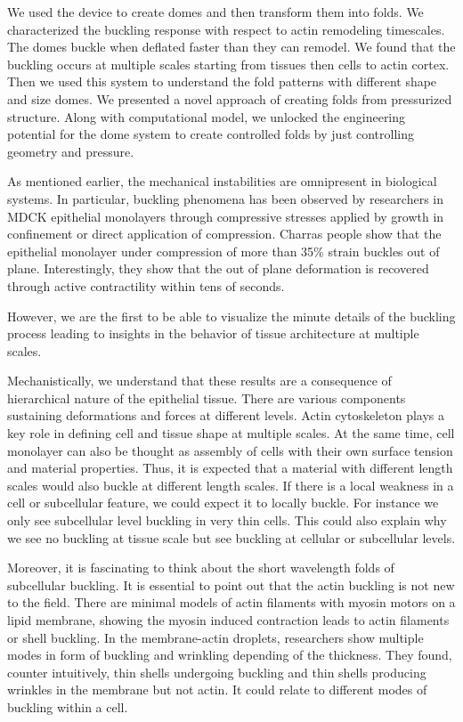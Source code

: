 We used the device to create domes and then transform them into folds.
We characterized the buckling response with respect to actin remodeling
timescales. The domes buckle when deflated faster than they can remodel.
We found that the buckling occurs at multiple scales starting from
tissues then cells to actin cortex. Then we used this system to
understand the fold patterns with different shape and size domes. We
presented a novel approach of creating folds from pressurized structure.
Along with computational model, we unlocked the engineering potential
for the dome system to create controlled folds by just controlling
geometry and pressure.

As mentioned earlier, the mechanical instabilities are omnipresent in
biological systems. In particular, buckling phenomena has been observed
by researchers in MDCK epithelial monolayers through compressive
stresses applied by growth in confinement or direct application of
compression. Charras people show that the epithelial monolayer under
compression of more than 35\% strain buckles out of plane.
Interestingly, they show that the out of plane deformation is recovered
through active contractility within tens of seconds.

However, we are the first to be able to visualize the minute details of
the buckling process leading to insights in the behavior of tissue
architecture at multiple scales.

Mechanistically, we understand that these results are a consequence of
hierarchical nature of the epithelial tissue. There are various
components sustaining deformations and forces at different levels. Actin
cytoskeleton plays a key role in defining cell and tissue shape at
multiple scales. At the same time, cell monolayer can also be thought as
assembly of cells with their own surface tension and material
properties. Thus, it is expected that a material with different length
scales would also buckle at different length scales. If there is a local
weakness in a cell or subcellular feature, we could expect it to locally
buckle. For instance we only see subcellular level buckling in very thin
cells. This could also explain why we see no buckling at tissue scale
but see buckling at cellular or subcellular levels.

Moreover, it is fascinating to think about the short wavelength folds of
subcellular buckling. It is essential to point out that the actin
buckling is not new to the field. There are minimal models of actin
filaments with myosin motors on a lipid membrane, showing the myosin
induced contraction leads to actin filaments or shell buckling. In the
membrane-actin droplets, researchers show multiple modes in form of
buckling and wrinkling depending of the thickness. They found, counter
intuitively, thin shells undergoing buckling and thin shells producing
wrinkles in the membrane but not actin. It could relate to different
modes of buckling within a cell.

